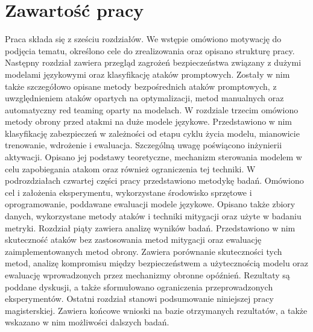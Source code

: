 \section{Zawartość pracy}

Praca składa się z sześciu rozdziałów. We wstępie omówiono motywację do podjęcia tematu, określono cele do zrealizowania oraz opisano strukturę pracy.
Następny rozdział zawiera przegląd zagrożeń bezpieczeństwa związany z dużymi modelami językowymi oraz klasyfikację ataków promptowych. Zostały w nim także szczegółowo opisane metody bezpośrednich ataków promptowych, z uwzględnieniem ataków opartych na optymalizacji, metod manualnych oraz automatyczny red teaming oparty na modelach.
W rozdziale trzecim omówiono metody obrony przed atakmi na duże modele językowe. Przedstawiono w nim klasyfikację zabezpieczeń w zależności od etapu cyklu życia modelu, mianowicie trenowanie, wdrożenie i ewaluacja. Szczególną uwagę poświącono inżynierii aktywacji. Opisano jej podstawy teoretyczne, mechanizm sterowania modelem w celu zapobiegania atakom oraz również ograniczenia tej techniki.
W podrozdziałach czwartej części pracy przedstawiono metodykę badań. Omówiono cel i założenia eksperymentu, wykorzystane środowisko sprzętowe i oprogramowanie, poddawane ewaluacji modele językowe. Opisano także zbiory danych, wykorzystane metody ataków i techniki mitygacji oraz użyte w badaniu metryki.
Rozdział piąty zawiera analizę wyników badań. Przedstawiono w nim skuteczność ataków bez zastosowania metod mitygacji oraz ewaluację zaimplementowanych metod obrony. Zawiera porównanie skuteczności tych metod, analizę kompromisu między bezpieczeństwem a użytecznością modelu oraz ewaluację wprowadzonych przez mechanizmy obronne opóźnień. Rezultaty są poddane dyskusji, a także sformułowano ograniczenia przeprowadzonych eksperymentów.
Ostatni rozdział stanowi podsumowanie niniejszej pracy magisterskiej. Zawiera końcowe wnioski na bazie otrzymanych rezultatów, a także wskazano w nim możliwości dalszych badań.